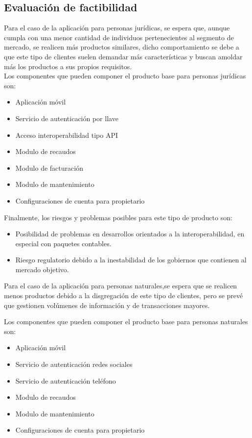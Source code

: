 \documentclass[letterpaper]{article}
\begin{document}
\subsection{Evaluación de factibilidad}

Para el caso de la aplicación para personas jurídicas, se espera que, aunque cumpla con una menor cantidad de individuos pertenecientes al segmento de mercado, se realicen más productos similares, dicho comportamiento se debe a que este tipo de clientes suelen demandar más características y buscan amoldar más los productos a sus propios requisitos. \\

Los componentes que pueden componer el producto base para personas jurídicas son:

\begin{itemize}
    \item Aplicación móvil
    \item Servicio de autenticación por llave
    \item Acceso interoperabilidad tipo API
    \item Modulo de recaudos
    \item Modulo de facturación
    \item Modulo de mantenimiento
    \item Configuraciones de cuenta para propietario
\end{itemize}

Finalmente, los riesgos y problemas posibles para este tipo de producto son:

\begin{itemize}
    \item Posibilidad de problemas en desarrollos orientados a la interoperabilidad, en especial con paquetes contables.
    \item Riesgo regulatorio debido a la inestabilidad de los gobiernos que contienen al mercado objetivo.
\end{itemize}

Para el caso de la aplicación para personas naturales,se espera que se realicen menos productos debido a la disgregación de este tipo de clientes, pero se prevé que gestionen volúmenes de información y de transacciones mayores. 

Los componentes que pueden componer el producto base para personas naturales son:

\begin{itemize}
    \item Aplicación móvil
    \item Servicio de autenticación redes sociales
    \item Servicio de autenticación teléfono
    \item Modulo de recaudos
    \item Modulo de mantenimiento
    \item Configuraciones de cuenta para propietario
\end{itemize}
\end{document}
